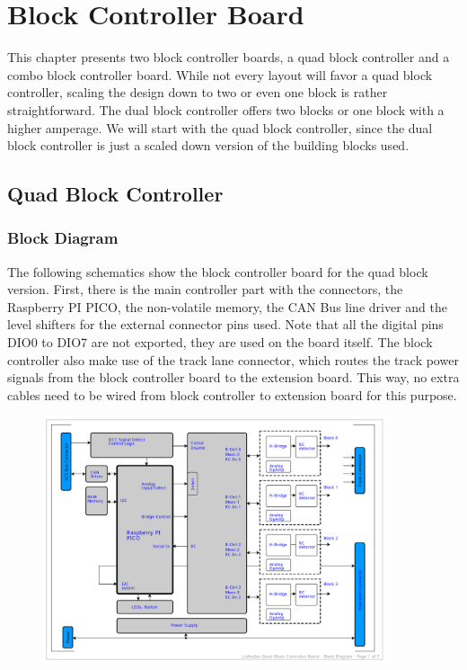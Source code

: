 \chapter{Block Controller Board}

This chapter presents two block controller boards, a quad block controller and a combo block controller board. While not every layout will favor a quad block controller, scaling the design down to two or even one block is rather straightforward. The dual block controller offers two blocks or one block with a higher amperage. We will start with the quad block controller, since the dual block controller is just a scaled down version of the building blocks used.

\section{Quad Block Controller}

\subsection{Block Diagram}

The following schematics show the block controller board for the quad block version. First, there is the main controller part with the connectors, the Raspberry PI PICO, the non-volatile memory, the CAN Bus line driver and the level shifters for the external connector pins used. Note that all the digital pins DIO0 to DIO7 are not exported, they are used on the board itself. The block controller also make use of the track lane connector, which routes the track power signals from the block controller board to the extension board. This way, no extra cables need to be wired from block controller to extension board for this purpose. 

\begin{figure}[htbp]
    \centering
    \includegraphics[page=1, width=0.9\textwidth]{./Schematics/Schematic_LcsNodes-Quad-Block-Controller.pdf}
\end{figure}
\FloatBarrier

